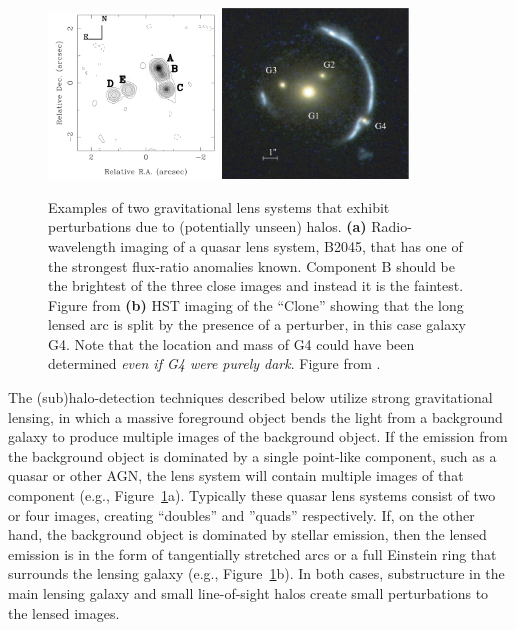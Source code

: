 \begin{figure}
    \centering
    \includegraphics[width=0.4\textwidth]{figures/2045_vla_dec96_x.png}    \includegraphics[width=0.44\textwidth]{figures/Clone_labeled.png}
    \caption{Examples of two gravitational lens systems that exhibit perturbations due to (potentially unseen) halos.  {\bf (a)} Radio-wavelength imaging of a quasar lens system, B2045, that has one of the strongest flux-ratio anomalies known.  Component B should be the brightest of the three close images and instead it is the faintest. Figure from \citet{Fassnacht++99}
    {\bf (b)} HST imaging of the ``Clone'' showing that the long lensed arc is split by the presence of a perturber, in this case galaxy G4.  Note that the location and mass of G4 could have been determined {\em even if G4 were purely dark}.  Figure from \citet{Vegetti_2010_1}.}
    \label{fig:stronglens_examples}
\end{figure}

The (sub)halo-detection techniques described below utilize strong gravitational lensing, in which a massive foreground object bends the light from a background galaxy to produce multiple images of the background object.  
If the emission from the background object is dominated by a single point-like component, such as a quasar or other AGN, the lens system will contain multiple images of that component (e.g., Figure~\ref{fig:stronglens_examples}a).
Typically these quasar lens systems consist of two or four images, creating ``doubles'' and ''quads'' respectively. 
If, on the other hand, the background object is dominated by stellar emission, then the lensed emission is in the form of tangentially stretched arcs or a full Einstein ring that surrounds the lensing galaxy (e.g., Figure~\ref{fig:stronglens_examples}b).  
In both cases, substructure in the main lensing galaxy and small line-of-sight halos create small perturbations to the lensed images.

